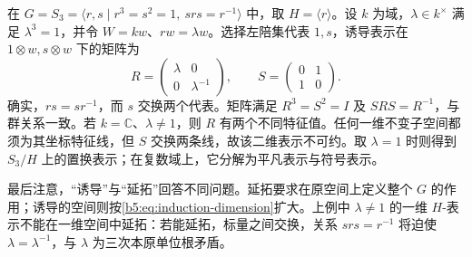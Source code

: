 \begin{example}\label{b5:exm:s3-cyclic-induction}
	在 \(G=S_3=\langle r,s\mid r^3=s^2=1,\ srs=r^{-1}\rangle\) 中，取 \(H=\langle r\rangle\)。设 \(k\) 为域，\(\lambda\in k^\times\) 满足 \(\lambda^3=1\)，并令 \(W=k w\)、\(rw=\lambda w\)。选择左陪集代表 \(1,s\)，诱导表示在 \(1\otimes w,s\otimes w\) 下的矩阵为
	\[
		R=\begin{pmatrix}\lambda&0\\0&\lambda^{-1}\end{pmatrix},
		\qquad
		S=\begin{pmatrix}0&1\\1&0\end{pmatrix}.
	\]
	确实，\(rs=sr^{-1}\)，而 \(s\) 交换两个代表。矩阵满足 \(R^3=S^2=I\) 及 \(SRS=R^{-1}\)，与群关系一致。若 \(k=\mathbb C\)、\(\lambda\ne1\)，则 \(R\) 有两个不同特征值。任何一维不变子空间都须为其坐标特征线，但 \(S\) 交换两条线，故该二维表示不可约。取 \(\lambda=1\) 时则得到 \(S_3/H\) 上的置换表示；在复数域上，它分解为平凡表示与符号表示。
\end{example}

最后注意，“诱导”与“延拓”回答不同问题。延拓要求在原空间上定义整个 \(G\) 的作用；诱导的空间则按\eqref{b5:eq:induction-dimension}扩大。上例中 \(\lambda\ne1\) 的一维 \(H\)-表示不能在一维空间中延拓：若能延拓，标量之间交换，关系 \(srs=r^{-1}\) 将迫使 \(\lambda=\lambda^{-1}\)，与 \(\lambda\) 为三次本原单位根矛盾。
